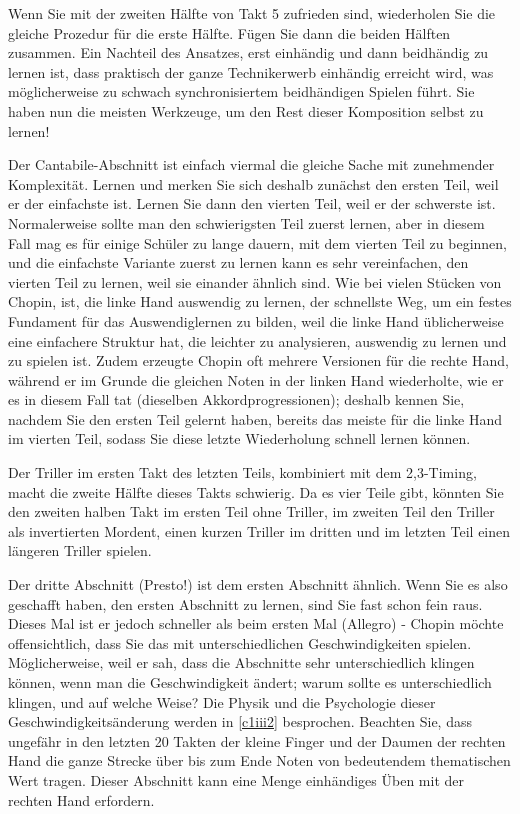 Wenn Sie mit der zweiten Hälfte von Takt 5 zufrieden sind, wiederholen Sie die gleiche Prozedur für die erste Hälfte.
Fügen Sie dann die beiden Hälften zusammen.
Ein Nachteil des Ansatzes, erst einhändig und dann beidhändig zu lernen ist, dass praktisch der ganze Technikerwerb einhändig erreicht wird, was möglicherweise zu schwach synchronisiertem beidhändigen Spielen führt.
Sie haben nun die meisten Werkzeuge, um den Rest dieser Komposition selbst zu lernen!

Der Cantabile-Abschnitt ist einfach viermal die gleiche Sache mit zunehmender Komplexität.
Lernen und merken Sie sich deshalb zunächst den ersten Teil, weil er der einfachste ist.
Lernen Sie dann den vierten Teil, weil er der schwerste ist.
Normalerweise sollte man den schwierigsten Teil zuerst lernen, aber in diesem Fall mag es für einige Schüler zu lange dauern, mit dem vierten Teil zu beginnen, und die einfachste Variante zuerst zu lernen kann es sehr vereinfachen, den vierten Teil zu lernen, weil sie einander ähnlich sind.
Wie  bei vielen Stücken von Chopin, ist, die linke Hand auswendig zu lernen, der schnellste Weg, um ein festes Fundament für das Auswendiglernen zu bilden, weil die linke Hand üblicherweise eine einfachere Struktur hat, die leichter zu analysieren, auswendig zu lernen und zu spielen ist.
Zudem erzeugte Chopin oft mehrere Versionen für die rechte Hand, während er im Grunde die gleichen Noten in der linken Hand wiederholte, wie er es in diesem Fall tat (dieselben Akkordprogressionen);
deshalb kennen Sie, nachdem Sie den ersten Teil gelernt haben, bereits das meiste für die linke Hand im vierten Teil, sodass Sie diese letzte Wiederholung schnell lernen können.

Der Triller im ersten Takt des letzten Teils, kombiniert mit dem 2,3-Timing, macht die zweite Hälfte dieses Takts schwierig.
Da es vier Teile gibt, könnten Sie den zweiten halben Takt im ersten Teil ohne Triller, im zweiten Teil den Triller als invertierten Mordent, einen kurzen Triller im dritten und im letzten Teil einen längeren Triller spielen.

Der dritte Abschnitt (Presto!) ist dem ersten Abschnitt ähnlich.
Wenn Sie es also geschafft haben, den ersten Abschnitt zu lernen, sind Sie fast schon fein raus.
Dieses Mal ist er jedoch schneller als beim ersten Mal (Allegro) - 
Chopin möchte offensichtlich, dass Sie das mit unterschiedlichen Geschwindigkeiten spielen.
Möglicherweise, weil er sah, dass die Abschnitte sehr unterschiedlich klingen können, wenn man die Geschwindigkeit ändert;
warum sollte es unterschiedlich klingen, und auf welche Weise?
Die Physik und die Psychologie dieser Geschwindigkeitsänderung werden in \hyperref[c1iii2]{\ref*{c1iii2}} besprochen.
Beachten Sie, dass ungefähr in den letzten 20 Takten der kleine Finger und der Daumen der rechten Hand die ganze Strecke über bis zum Ende Noten von bedeutendem thematischen Wert tragen.
Dieser Abschnitt kann eine Menge einhändiges Üben mit der rechten Hand erfordern.


